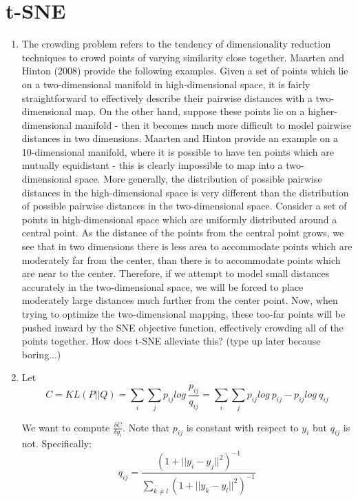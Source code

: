 \documentclass[a4paper]{article}
\begin{document}
\section{t-SNE}
\begin{enumerate}
\item{
The crowding problem refers to the tendency of dimensionality reduction techniques to crowd points of varying similarity close together. 
\newline
\newline
Maarten and Hinton (2008) provide the following examples. Given a set of points which lie on a two-dimensional manifold in high-dimensional space, it is fairly straightforward to effectively describe their pairwise distances with a two-dimensional map. On the other hand, suppose these points lie on a higher-dimensional manifold - then it becomes much more difficult to model pairwise distances in two dimensions. Maarten and Hinton provide an example on a 10-dimensional manifold, where it is possible to have ten points which are mutually equidistant - this is clearly impossible to map into a two-dimensional space. 
\newline
\newline
More generally, the distribution of possible pairwise distances in the high-dimensional space is very different than the distribution of possible pairwise distances in the two-dimensional space. Consider a set of points in high-dimensional space which are uniformly distributed around a central point. As the distance of the points from the central point grows, we see that in two dimensions there is less area to accommodate points which are moderately far from the center, than there is to accommodate points which are near to the center. Therefore, if we attempt to model small distances accurately in the two-dimensional space, we will be forced to place moderately large distances much further from the center point. Now, when trying to optimize the two-dimensional mapping, these too-far points will be pushed inward by the SNE objective function, effectively crowding all of the points together.
\newline
\newline
How does t-SNE alleviate this? (type up later because boring...)

}
\item{ Let 
$$C = KL(P || Q) = \sum_i \sum_j p_{ij} log\ \frac{p_{ij}}{q_{ij}} = \sum_i \sum_j p_{ij} log\ p_{ij} - p_{ij} log\ q_{ij}$$

We want to compute $\frac{\delta C }{\delta y_i}$. Note that $p_{ij}$ is constant with respect to $y_i$ but $q_{ij}$ is not. Specifically:
$$q_{ij} = \frac{ (1+ ||y_i - y_j ||^2)^{-1} }{\sum_{k \neq l} (1 + ||y_k - y_l ||^2)^{-1} }$$ 

}
\end{enumerate}
\end{document}
